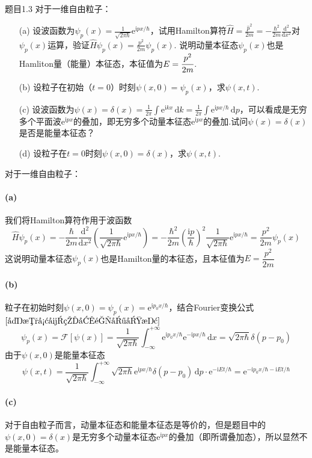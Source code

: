 \begin{question}{题目1.3}
    对于一维自由粒子：
    \begin{enumerate}
        \item[(a)] 设波函数为$\displaystyle \psi_p(x)=\frac{1}{\sqrt{2\pi\hbar}}\mathrm{e}^{\mathrm{i}px/\hbar}$，试用Hamilton算符$\displaystyle \hat{H}=\frac{\hat{p}^2}{2m}=-\frac{\hbar^2}{2m}\frac{\mathrm{d}^2}{\mathrm{d}x^2}$对$\psi_p(x)$运算，验证$\displaystyle \hat{H}\psi_p(x)=\frac{p^2}{2m}\psi_p(x)$. 说明动量本征态$\psi_p(x)$也是Hamliton量（能量）本征态，本征值为$\displaystyle E=\cfrac{p^2}{2m}$.
        \item[(b)] 设粒子在初始（$t=0$）时刻$\psi(x,0)=\psi_p(x)$，求$\psi(x,t)$.
        \item[(c)] 设波函数为$\displaystyle \psi(x)=\delta(x)=\frac{1}{2\pi}\int\mathrm{e}^{\mathrm{i}kx}\,\mathrm{d}k=\frac{1}{2\pi}\int\mathrm{e}^{\mathrm{i}px/\hbar}\,\mathrm{d}p$，可以看成是无穷多个平面波$\mathrm{e}^{\mathrm{i}px}$的叠加，即无穷多个动量本征态$\mathrm{e}^{\mathrm{i}px}$的叠加.试问$\psi(x)=\delta(x)$是否是能量本征态？
        \item[(d)] 设粒子在$t=0$时刻$\psi(x,0)=\delta(x)$，求$\psi(x,t)$.
    \end{enumerate}
\end{question}
\begin{solution}
    对于一维自由粒子：
    \paragraph{(a)} 我们将Hamilton算符作用于波函数
    $$
        \hat{H}\psi_p(x)
        =-\frac{\hbar}{2m}\frac{\mathrm{d}^2}{\mathrm{d}x^2}\left(\frac{1}{\sqrt{2\pi\hbar}}\mathrm{e}^{\mathrm{i}px/\hbar}\right)
        =-\frac{\hbar^2}{2m}\left(\frac{\mathrm{i}p}{\hbar}\right)^2 \frac{1}{\sqrt{2\pi\hbar}}\mathrm{e}^{\mathrm{i}px/\hbar}
        =\frac{p^2}{2m}\psi_p(x)
    $$
    这说明动量本征态$\psi_p(x)$也是Hamilton量的本征态，且本征值为$E=\dfrac{p^2}{2m}$

    \paragraph{(b)}粒子在初始时刻$\psi(x,0) = \psi_p(x) = \mathrm{e}^{\mathrm{i}p_0x/\hbar}$，结合Fourier变换公式$\eqref{复数形式的傅里叶变换}$
    $$
        \psi_p(x)=\mathcal{F}[\psi(x)]
        =\frac{1}{\sqrt{2\pi\hbar}}\int_{-\infty}^{+\infty}\mathrm{e}^{\mathrm{i}p_0x/\hbar}\mathrm{e}^{-\mathrm{i}px/\hbar}\,\mathrm{d}x
        =\sqrt{2\pi\hbar}\delta(p-p_0)
    $$
    由于$\psi(x,0)$是能量本征态
    $$
        \psi(x, t) = \frac{1}{\sqrt{2\pi\hbar}}\int_{-\infty}^{+\infty}\sqrt{2\pi\hbar}\mathrm{e}^{\mathrm{i}px/\hbar}\delta(p-p_0)\,\mathrm{d}p\cdot\mathrm{e}^{-\mathrm{i}Et/\hbar}
        =\mathrm{e}^{-\mathrm{i}p_0x/\hbar-\mathrm{i}Et/\hbar}
    $$

    \paragraph{(c)} 对于自由粒子而言，动量本征态和能量本征态是等价的，但是题目中的$\psi(x, 0)=\delta(x)$是无穷多个动量本征态$\mathrm{e}^{\mathrm{i}px}$的叠加（即所谓叠加态），所以显然不是能量本征态。
\end{solution}


